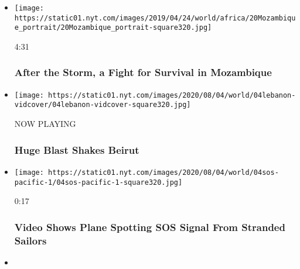 \begin{itemize}
\item
  \href{https://www.nytimes.com/video/world/africa/100000006439514/mozambique-flood-cyclone-idai.html?action=click\&module=video-series-bar\&region=header\&pgtype=Article\&playlistId=video/world}{}

  \texttt{[image: https://static01.nyt.com/images/2019/04/24/world/africa/20Mozambique\_portrait/20Mozambique\_portrait-square320.jpg]}

  4:31

  \hypertarget{after-the-storm-a-fight-for-survival-in-mozambique}{%
  \subsubsection{After the Storm, a Fight for Survival in
  Mozambique}\label{after-the-storm-a-fight-for-survival-in-mozambique}}
\item
  \texttt{[image: https://static01.nyt.com/images/2020/08/04/world/04lebanon-vidcover/04lebanon-vidcover-square320.jpg]}

  NOW PLAYING

  \hypertarget{huge-blast-shakes-beirut-1}{%
  \subsubsection{Huge Blast Shakes
  Beirut}\label{huge-blast-shakes-beirut-1}}
\item
  \href{https://www.nytimes.com/video/world/100000007271927/pacific-island-rescue-video.html?action=click\&module=video-series-bar\&region=header\&pgtype=Article\&playlistId=video/world}{}

  \texttt{[image: https://static01.nyt.com/images/2020/08/04/world/04sos-pacific-1/04sos-pacific-1-square320.jpg]}

  0:17

  \hypertarget{video-shows-plane-spotting-sos-signal-from-stranded-sailors}{%
  \subsubsection{Video Shows Plane Spotting SOS Signal From Stranded
  Sailors}\label{video-shows-plane-spotting-sos-signal-from-stranded-sailors}}
\item
  \href{https://www.nytimes.com/video/us/100000007249534/vivienne-westwood-canary-julian-assange.html?action=click\&module=video-series-bar\&region=header\&pgtype=Article\&playlistId=video/world}{}


\end{itemize}
